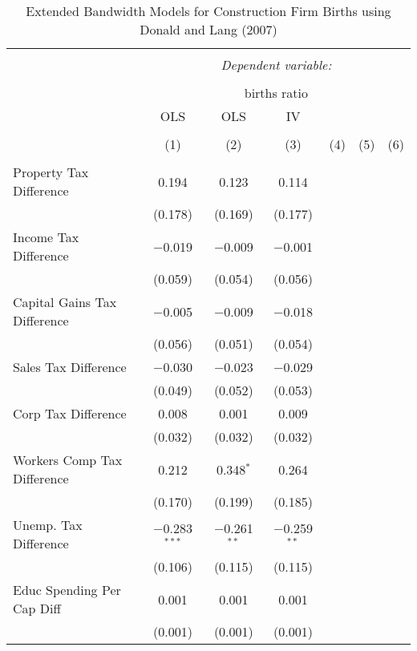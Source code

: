 
\begin{table}[!htbp] \centering 
  \caption{Extended Bandwidth Models for  Construction Firm Births using Donald and Lang (2007)} 
  \label{} 
\begin{tabular}{@{\extracolsep{5pt}}lcccccc} 
\\[-1.8ex]\hline 
\hline \\[-1.8ex] 
 & \multicolumn{6}{c}{\textit{Dependent variable:}} \\ 
\cline{2-7} 
\\[-1.8ex] & \multicolumn{6}{c}{births ratio} \\ 
 & OLS & OLS & IV &  &  &  \\ 
\\[-1.8ex] & (1) & (2) & (3) & (4) & (5) & (6)\\ 
\hline \\[-1.8ex] 
 Property Tax Difference & 0.194 & 0.123 & 0.114 &  &  &  \\ 
  & (0.178) & (0.169) & (0.177) &  &  &  \\ 
  Income Tax Difference & $-$0.019 & $-$0.009 & $-$0.001 &  &  &  \\ 
  & (0.059) & (0.054) & (0.056) &  &  &  \\ 
  Capital Gains Tax Difference & $-$0.005 & $-$0.009 & $-$0.018 &  &  &  \\ 
  & (0.056) & (0.051) & (0.054) &  &  &  \\ 
  Sales Tax Difference & $-$0.030 & $-$0.023 & $-$0.029 &  &  &  \\ 
  & (0.049) & (0.052) & (0.053) &  &  &  \\ 
  Corp Tax Difference & 0.008 & 0.001 & 0.009 &  &  &  \\ 
  & (0.032) & (0.032) & (0.032) &  &  &  \\ 
  Workers Comp Tax Difference & 0.212 & 0.348$^{*}$ & 0.264 &  &  &  \\ 
  & (0.170) & (0.199) & (0.185) &  &  &  \\ 
  Unemp. Tax Difference & $-$0.283$^{***}$ & $-$0.261$^{**}$ & $-$0.259$^{**}$ &  &  &  \\ 
  & (0.106) & (0.115) & (0.115) &  &  &  \\ 
  Educ Spending Per Cap Diff & 0.001 & 0.001 & 0.001 &  &  &  \\ 
  & (0.001) & (0.001) & (0.001) &  &  &  \\ 

\end{tabular}
\end{table}
